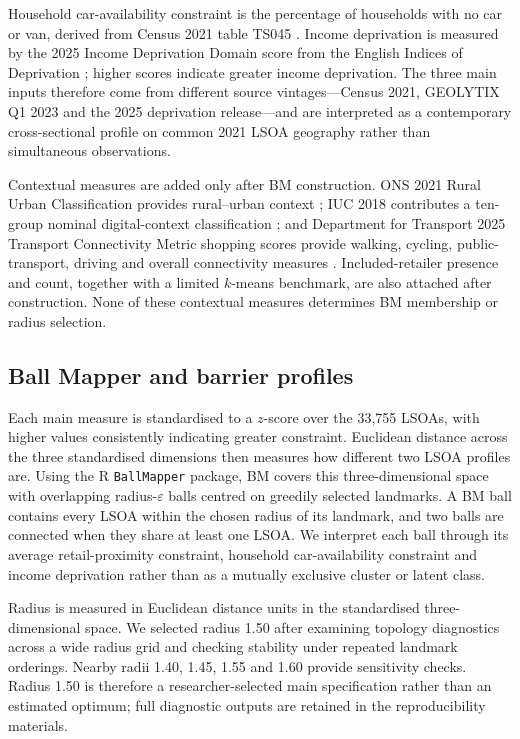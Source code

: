 \documentclass[11pt,a4paper]{article}
\begin{document}
Household car-availability constraint is the percentage of households with no car or van, derived from Census 2021 table TS045 \citep{ONS2023Car}. Income deprivation is measured by the 2025 Income Deprivation Domain score from the English Indices of Deprivation \citep{MHCLG2025}; higher scores indicate greater income deprivation. The three main inputs therefore come from different source vintages---Census 2021, GEOLYTIX Q1 2023 and the 2025 deprivation release---and are interpreted as a contemporary cross-sectional profile on common 2021 LSOA geography rather than simultaneous observations.

Contextual measures are added only after BM construction. ONS 2021 Rural Urban Classification provides rural--urban context \citep{ONS2026RUC}; IUC 2018 contributes a ten-group nominal digital-context classification \citep{AlexiouSingleton2018}; and Department for Transport 2025 Transport Connectivity Metric shopping scores provide walking, cycling, public-transport, driving and overall connectivity measures \citep{DfT2025}. Included-retailer presence and count, together with a limited $k$-means benchmark, are also attached after construction. None of these contextual measures determines BM membership or radius selection.

\subsection{Ball Mapper and barrier profiles}
Each main measure is standardised to a $z$-score over the 33,755 LSOAs, with higher values consistently indicating greater constraint. Euclidean distance across the three standardised dimensions then measures how different two LSOA profiles are. Using the R \texttt{BallMapper} package, BM covers this three-dimensional space with overlapping radius-$\varepsilon$ balls centred on greedily selected landmarks. A BM ball contains every LSOA within the chosen radius of its landmark, and two balls are connected when they share at least one LSOA. We interpret each ball through its average retail-proximity constraint, household car-availability constraint and income deprivation rather than as a mutually exclusive cluster or latent class.

Radius is measured in Euclidean distance units in the standardised three-dimensional space. We selected radius 1.50 after examining topology diagnostics across a wide radius grid and checking stability under repeated landmark orderings. Nearby radii 1.40, 1.45, 1.55 and 1.60 provide sensitivity checks. Radius 1.50 is therefore a researcher-selected main specification rather than an estimated optimum; full diagnostic outputs are retained in the reproducibility materials.
\end{document}
